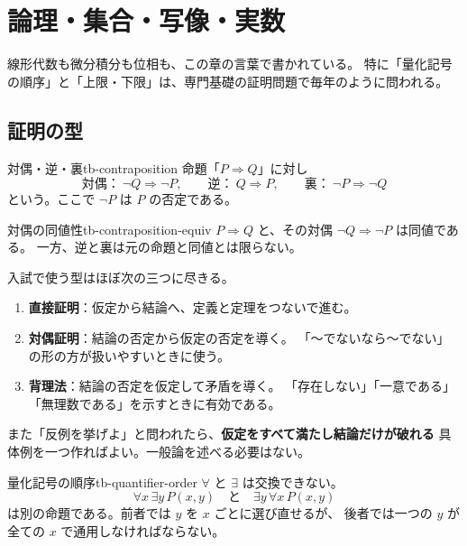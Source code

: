 \chapter{論理・集合・写像・実数}
\label{ch:tb-foundations}

線形代数も微分積分も位相も、この章の言葉で書かれている。
特に「量化記号の順序」と「上限・下限」は、専門基礎の証明問題で毎年のように問われる。

\section{証明の型}

\begin{definition}{対偶・逆・裏}{tb-contraposition}
命題「$P\Longrightarrow Q$」に対し
\[
\text{対偶：}\ \lnot Q\Longrightarrow\lnot P,\qquad
\text{逆：}\ Q\Longrightarrow P,\qquad
\text{裏：}\ \lnot P\Longrightarrow\lnot Q
\]
という。ここで $\lnot P$ は $P$ の否定である。
\end{definition}

\begin{proposition}{対偶の同値性}{tb-contraposition-equiv}
$P\Longrightarrow Q$ と、その対偶 $\lnot Q\Longrightarrow\lnot P$ は同値である。
一方、逆と裏は元の命題と同値とは限らない。
\end{proposition}

入試で使う型はほぼ次の三つに尽きる。
\begin{enumerate}
  \item \textbf{直接証明}：仮定から結論へ、定義と定理をつないで進む。
  \item \textbf{対偶証明}：結論の否定から仮定の否定を導く。
        「〜でないなら〜でない」の形の方が扱いやすいときに使う。
  \item \textbf{背理法}：結論の否定を仮定して矛盾を導く。
        「存在しない」「一意である」「無理数である」を示すときに有効である。
\end{enumerate}
また「反例を挙げよ」と問われたら、\textbf{仮定をすべて満たし結論だけが破れる}
具体例を一つ作ればよい。一般論を述べる必要はない。

\begin{definition}{量化記号の順序}{tb-quantifier-order}
$\forall$ と $\exists$ は交換できない。
\[
\forall x\,\exists y\,P(x,y)
\quad\text{と}\quad
\exists y\,\forall x\,P(x,y)
\]
は別の命題である。前者では $y$ を $x$ ごとに選び直せるが、
後者では一つの $y$ が全ての $x$ で通用しなければならない。
\end{definition}

